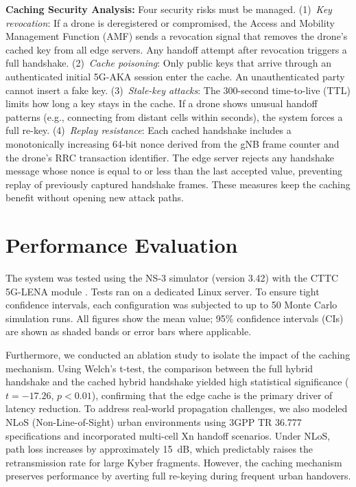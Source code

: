 \documentclass{ieeeaccess}
\begin{document}
\textbf{Caching Security Analysis:} Four security risks must be managed. (1)~\textit{Key revocation}: If a drone is deregistered or compromised, the Access and Mobility Management Function (AMF) sends a revocation signal that removes the drone's cached key from all edge servers. Any handoff attempt after revocation triggers a full handshake. (2)~\textit{Cache poisoning}: Only public keys that arrive through an authenticated initial 5G-AKA session enter the cache. An unauthenticated party cannot insert a fake key. (3)~\textit{Stale-key attacks}: The 300-second time-to-live (TTL) limits how long a key stays in the cache. If a drone shows unusual handoff patterns (e.g., connecting from distant cells within seconds), the system forces a full re-key. (4)~\textit{Replay resistance}: Each cached handshake includes a monotonically increasing 64-bit nonce derived from the gNB frame counter and the drone's RRC transaction identifier. The edge server rejects any handshake message whose nonce is equal to or less than the last accepted value, preventing replay of previously captured handshake frames. These measures keep the caching benefit without opening new attack paths.

\section{Performance Evaluation}
\label{sec:evaluation}

The system was tested using the NS-3 simulator (version 3.42) with the CTTC 5G-LENA module \cite{ref11,ref12}. Tests ran on a dedicated Linux server. To ensure tight confidence intervals, each configuration was subjected to up to 50 Monte Carlo simulation runs. All figures show the mean value; 95\% confidence intervals (CIs) are shown as shaded bands or error bars where applicable.

Furthermore, we conducted an ablation study to isolate the impact of the caching mechanism. Using Welch's t-test, the comparison between the full hybrid handshake and the cached hybrid handshake yielded high statistical significance ($t = -17.26$, $p < 0.01$), confirming that the edge cache is the primary driver of latency reduction. To address real-world propagation challenges, we also modeled NLoS (Non-Line-of-Sight) urban environments using 3GPP TR 36.777 specifications and incorporated multi-cell Xn handoff scenarios. Under NLoS, path loss increases by approximately 15~dB, which predictably raises the retransmission rate for large Kyber fragments. However, the caching mechanism preserves performance by averting full re-keying during frequent urban handovers.
\end{document}
